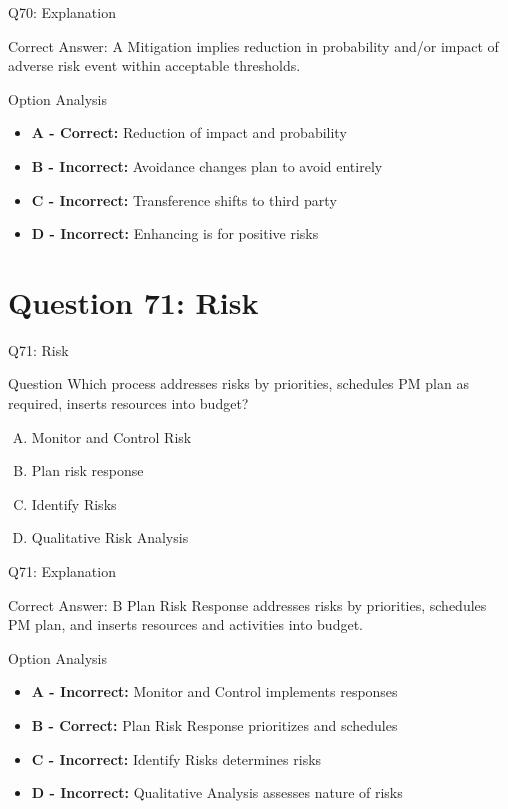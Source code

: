 \documentclass{beamer}
\begin{document}
	\begin{frame}{Q70: Explanation}
		\begin{block}{Correct Answer: A}
			Mitigation implies reduction in probability and/or impact of adverse risk event within acceptable thresholds.
		\end{block}
		\begin{block}{Option Analysis}
			\begin{itemize}
				\item \textbf{A - Correct:} Reduction of impact and probability
				\item \textbf{B - Incorrect:} Avoidance changes plan to avoid entirely
				\item \textbf{C - Incorrect:} Transference shifts to third party
				\item \textbf{D - Incorrect:} Enhancing is for positive risks
			\end{itemize}
		\end{block}
	\end{frame}
	
	\section{Question 71:  Risk }
	
	\begin{frame}{Q71:  Risk  }
		\begin{block}{Question}
			Which process addresses risks by priorities, schedules PM plan as required, inserts resources into budget?
		\end{block}
		\begin{enumerate}[(A)]
			\item Monitor and Control Risk
			\item Plan risk response
			\item Identify Risks
			\item Qualitative Risk Analysis
		\end{enumerate}
	\end{frame}
	
	\begin{frame}{Q71: Explanation}
		\begin{block}{Correct Answer: B}
			Plan Risk Response addresses risks by priorities, schedules PM plan, and inserts resources and activities into budget.
		\end{block}
		\begin{block}{Option Analysis}
			\begin{itemize}
				\item \textbf{A - Incorrect:} Monitor and Control implements responses
				\item \textbf{B - Correct:} Plan Risk Response prioritizes and schedules
				\item \textbf{C - Incorrect:} Identify Risks determines risks
				\item \textbf{D - Incorrect:} Qualitative Analysis assesses nature of risks
			\end{itemize}
		\end{block}
	\end{frame}
	
\end{document}
